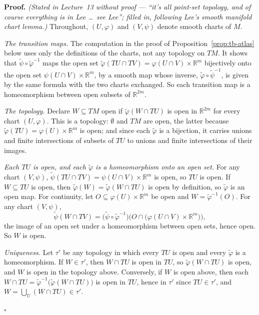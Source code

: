 \documentclass[11pt]{report}
\renewenvironment{proof}[1][Proof]{\noindent\textbf{#1.} }{\hfill$\square$\par\vspace{5pt}}
\begin{document}
\begin{proof}
\textit{(Stated in Lecture~13 without proof --- ``it's all point-set topology, and of course everything is in Lee \ldots\ see Lee''; filled in, following Lee's smooth manifold chart lemma.)} Throughout, $(U, \varphi)$ and $(V, \psi)$ denote smooth charts of $M$.

\emph{The transition maps.} The computation in the proof of Proposition~\ref{prop:tb-atlas} below uses only the definitions of the charts, not any topology on $TM$. It shows that $\tilde\psi \circ \tilde\varphi^{-1}$ maps the open set $\tilde\varphi(TU \cap TV) = \varphi(U \cap V) \times \mathbb{R}^m$ bijectively onto the open set $\psi(U \cap V) \times \mathbb{R}^m$, by a smooth map whose inverse, $\tilde\varphi \circ \tilde\psi^{-1}$, is given by the same formula with the two charts exchanged. So each transition map is a homeomorphism between open subsets of $\mathbb{R}^{2m}$.

\emph{The topology.} Declare $W \subseteq TM$ open if $\tilde\varphi(W \cap TU)$ is open in $\mathbb{R}^{2m}$ for every chart $(U, \varphi)$. This is a topology: $\emptyset$ and $TM$ are open, the latter because $\tilde\varphi(TU) = \varphi(U) \times \mathbb{R}^m$ is open; and since each $\tilde\varphi$ is a bijection, it carries unions and finite intersections of subsets of $TU$ to unions and finite intersections of their images.

\emph{Each $TU$ is open, and each $\tilde\varphi$ is a homeomorphism onto an open set.} For any chart $(V, \psi)$, $\tilde\psi(TU \cap TV) = \psi(U \cap V) \times \mathbb{R}^m$ is open, so $TU$ is open. If $W \subseteq TU$ is open, then $\tilde\varphi(W) = \tilde\varphi(W \cap TU)$ is open by definition, so $\tilde\varphi$ is an open map. For continuity, let $O \subseteq \varphi(U) \times \mathbb{R}^m$ be open and $W = \tilde\varphi^{-1}(O)$. For any chart $(V, \psi)$,
\[
\tilde\psi(W \cap TV) = \big(\tilde\psi \circ \tilde\varphi^{-1}\big)\Big(O \cap \big(\varphi(U \cap V) \times \mathbb{R}^m\big)\Big),
\]
the image of an open set under a homeomorphism between open sets, hence open. So $W$ is open.

\emph{Uniqueness.} Let $\tau'$ be any topology in which every $TU$ is open and every $\tilde\varphi$ is a homeomorphism. If $W \in \tau'$, then $W \cap TU$ is open in $TU$, so $\tilde\varphi(W \cap TU)$ is open, and $W$ is open in the topology above. Conversely, if $W$ is open above, then each $W \cap TU = \tilde\varphi^{-1}\big(\tilde\varphi(W \cap TU)\big)$ is open in $TU$, hence in $\tau'$ since $TU \in \tau'$, and $W = \bigcup_U (W \cap TU) \in \tau'$.


\end{proof}
\end{document}
